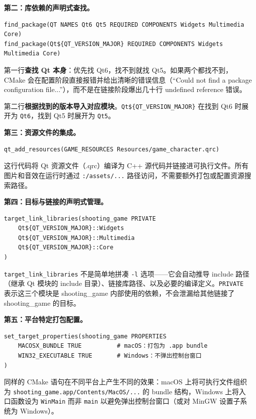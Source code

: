 \documentclass[utf8]{ctexart}
\begin{document}
\textbf{第二：库依赖的声明式查找。}

\begin{verbatim}
find_package(QT NAMES Qt6 Qt5 REQUIRED COMPONENTS Widgets Multimedia Core)
find_package(Qt${QT_VERSION_MAJOR} REQUIRED COMPONENTS Widgets Multimedia Core)
\end{verbatim}

第一行\textbf{查找 Qt 本身}：优先找 Qt6，找不到就找 Qt5。如果两个都找不到，CMake 会在配置阶段直接报错并给出清晰的错误信息（“Could not find a package configuration file...”），而不是在链接阶段爆出几十行 undefined reference 错误。

第二行\textbf{根据找到的版本导入对应模块}。\texttt{Qt\$\{QT\_VERSION\_MAJOR\}} 在找到 Qt6 时展开为 \texttt{Qt6}，找到 Qt5 时展开为 \texttt{Qt5}。

\textbf{第三：资源文件的集成。}

\begin{verbatim}
qt_add_resources(GAME_RESOURCES Resources/game_character.qrc)
\end{verbatim}

\noindent 这行代码将 Qt 资源文件（.qrc）编译为 C++ 源代码并链接进可执行文件。所有图片和音效在运行时通过 \texttt{:/assets/...} 路径访问，不需要额外打包或配置资源搜索路径。

\textbf{第四：目标与链接的声明式管理。}

\begin{verbatim}
target_link_libraries(shooting_game PRIVATE
    Qt${QT_VERSION_MAJOR}::Widgets
    Qt${QT_VERSION_MAJOR}::Multimedia
    Qt${QT_VERSION_MAJOR}::Core
)
\end{verbatim}

\noindent \texttt{target\_link\_libraries} 不是简单地拼凑 \texttt{-l} 选项——它会自动推导 include 路径（继承 Qt 模块的 include 目录）、链接库路径、以及必要的编译定义。\texttt{PRIVATE} 表示这三个模块是 shooting\_game 内部使用的依赖，不会泄漏给其他链接了 shooting\_game 的目标。

\textbf{第五：平台特定打包配置。}

\begin{verbatim}
set_target_properties(shooting_game PROPERTIES
    MACOSX_BUNDLE TRUE          # macOS：打包为 .app bundle
    WIN32_EXECUTABLE TRUE       # Windows：不弹出控制台窗口
)
\end{verbatim}

\noindent 同样的 CMake 语句在不同平台上产生不同的效果：macOS 上将可执行文件组织为 \texttt{shooting\_game.app/Contents/MacOS/...} 的 bundle 结构，Windows 上将入口函数设为 \texttt{WinMain} 而非 \texttt{main} 以避免弹出控制台窗口（或对 MinGW 设置子系统为 Windows）。
\end{document}
